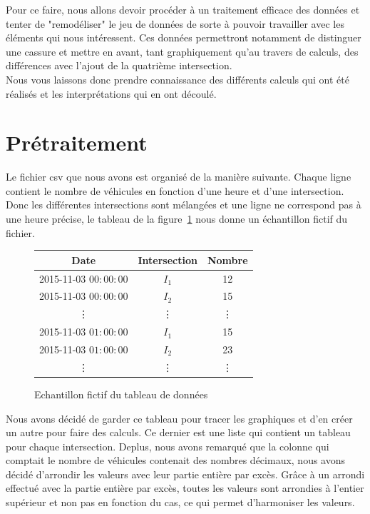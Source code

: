 \documentclass[titlepage]{article}
\begin{document}
Pour ce faire, nous allons devoir procéder à  un traitement efficace des données et tenter de "remodéliser" le jeu de données de sorte à  pouvoir travailler avec les éléments qui nous intéressent. Ces données permettront notamment de distinguer une cassure et mettre en avant, tant graphiquement qu'au travers de calculs, des différences avec l'ajout de la quatrième intersection. 
\vspace{0.5cm}
\\
Nous vous laissons donc prendre connaissance des différents calculs qui ont été réalisés et les interprétations qui en ont découlé.

\newpage

\section{Prétraitement}

Le fichier csv que nous avons est organisé de la manière suivante. Chaque ligne contient
le nombre de véhicules en fonction d'une heure et d'une
intersection. Donc les différentes intersections sont
mélangées et une ligne ne correspond pas à une heure
précise, le tableau de la figure~\ref{figure:fig1} nous donne un échantillon fictif du fichier.
\vspace{0.5cm}

\begin{figure}[H]
\centering

\begin{tabular}{|c|c|c|}
\hline
Date & Intersection & Nombre\\
\hline
2015-11-03 $00 {:} 00 {:} 00$ & $I_1$ & 12\\
2015-11-03 $00 {:} 00 {:}  00$ & $I_2$ & 15\\
\vdots & \vdots & \vdots\\
2015-11-03 $01 {:} 00 {:}  00$ & $I_1$ & 15\\
2015-11-03 $01 {:} 00 {:}  00$ & $I_2$ & 23\\
\vdots & \vdots & \vdots\\
\hline
\end{tabular}

\caption{Echantillon fictif du tableau de données}
\label{figure:fig1}
\end{figure}

\vspace{0.5cm}
Nous avons décidé de garder ce tableau pour
tracer les graphiques et d'en créer un autre pour faire
des calculs. Ce dernier est une liste qui contient un 
tableau pour chaque intersection. Deplus, nous avons
remarqué que la colonne qui comptait le nombre de
véhicules contenait des nombres décimaux, nous avons
décidé d'arrondir les valeurs avec leur partie entière
par excès. Grâce à un arrondi effectué avec la partie entière par excès,
toutes les valeurs sont arrondies à l'entier supérieur et non pas en fonction
du cas, ce qui permet d'harmoniser les valeurs.\\
\end{document}
